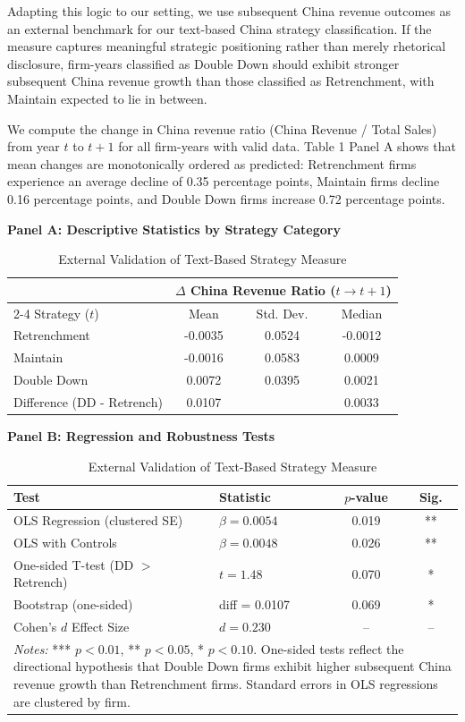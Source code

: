 \documentclass{article}
\begin{document}
Adapting this logic to our setting, we use subsequent China revenue
outcomes as an external benchmark for our text-based China strategy
classification. If the measure captures meaningful strategic positioning
rather than merely rhetorical disclosure, firm-years classified as
Double Down should exhibit stronger subsequent China revenue growth than
those classified as Retrenchment, with Maintain expected to lie in
between.

We compute the change in China revenue ratio (China Revenue / Total
Sales) from year $t$ to $t+1$ for all firm-years with valid data. Table 1
Panel A shows that mean changes are monotonically ordered as predicted:
Retrenchment firms experience an average decline of 0.35 percentage
points, Maintain firms decline 0.16 percentage points, and Double Down
firms increase 0.72 percentage points.

\begin{table}[htbp]
\centering
\caption{External Validation of Text-Based Strategy Measure}
\vspace{0.2cm}

\textbf{Panel A: Descriptive Statistics by Strategy Category}
\vspace{0.1cm}

\begin{tabular}{lccc}
\toprule
 & \multicolumn{3}{c}{$\Delta$ China Revenue Ratio ($t \rightarrow t+1$)} \\
\cmidrule(lr){2-4}
Strategy ($t$) & Mean & Std. Dev. & Median \\
\midrule
Retrenchment & -0.0035 & 0.0524 & -0.0012 \\
Maintain     & -0.0016 & 0.0583 &  0.0009 \\
Double Down  &  0.0072 & 0.0395 &  0.0021 \\
\midrule
Difference (DD - Retrench) & 0.0107 & & 0.0033 \\
\bottomrule
\end{tabular}

\vspace{0.5cm}

\textbf{Panel B: Regression and Robustness Tests}
\vspace{0.1cm}

\begin{tabular}{llcc}
\toprule
Test & Statistic & $p$-value & Sig. \\
\midrule
OLS Regression (clustered SE) & $\beta = 0.0054$ & 0.019 & ** \\
OLS with Controls & $\beta = 0.0048$ & 0.026 & ** \\
One-sided T-test (DD $>$ Retrench) & $t = 1.48$ & 0.070 & * \\
Bootstrap (one-sided) & diff = 0.0107 & 0.069 & * \\
Cohen's $d$ Effect Size & $d = 0.230$ & -- & -- \\
\bottomrule
\multicolumn{4}{p{10cm}}{\footnotesize \textit{Notes:} *** $p<0.01$, ** $p<0.05$, * $p<0.10$. One-sided tests reflect the directional hypothesis that Double Down firms exhibit higher subsequent China revenue growth than Retrenchment firms. Standard errors in OLS regressions are clustered by firm.}
\end{tabular}
\end{table}
\end{document}
